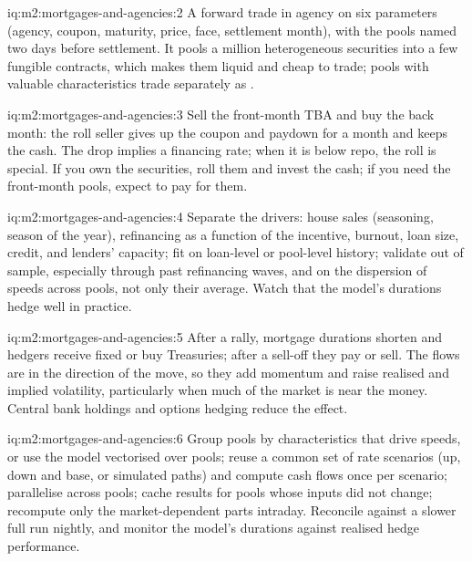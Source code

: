 \begin{solution}{iq:m2:mortgages-and-agencies:2}
A forward trade in agency  on six parameters (agency, coupon,
maturity, price, face, settlement month), with the pools named two days before
settlement. It pools a million heterogeneous securities into a few fungible
contracts, which makes them liquid and cheap to trade; pools with valuable
characteristics trade separately as .
\end{solution}

\begin{solution}{iq:m2:mortgages-and-agencies:3}
Sell the front-month TBA and buy the back month: the roll seller gives up the
coupon and paydown for a month and keeps the cash. The drop implies a financing
rate; when it is below repo, the roll is special. If you own the securities,
roll them and invest the cash; if you need the front-month pools, expect to pay
for them.
\end{solution}

\begin{solution}{iq:m2:mortgages-and-agencies:4}
Separate the drivers: house sales (seasoning, season of the year), refinancing
as a function of the incentive, burnout, loan size, credit, and lenders'
capacity; fit on loan-level or pool-level history; validate out of sample,
especially through past refinancing waves, and on the dispersion of speeds
across pools, not only their average. Watch that the model's durations hedge
well in practice.
\end{solution}

\begin{solution}{iq:m2:mortgages-and-agencies:5}
After a rally, mortgage durations shorten and hedgers receive fixed or buy
Treasuries; after a sell-off they pay or sell. The flows are in the direction
of the move, so they add momentum and raise realised and implied volatility,
particularly when much of the market is near the money. Central bank holdings
and options hedging reduce the effect.
\end{solution}

\begin{solution}{iq:m2:mortgages-and-agencies:6}
Group pools by characteristics that drive speeds, or use the  model
vectorised over pools; reuse a common set of rate scenarios (up, down and base,
or simulated paths) and compute cash flows once per scenario; parallelise across
pools; cache results for pools whose inputs did not change; recompute only the
market-dependent parts intraday. Reconcile against a slower full run nightly,
and monitor the model's durations against realised hedge performance.
\end{solution}
